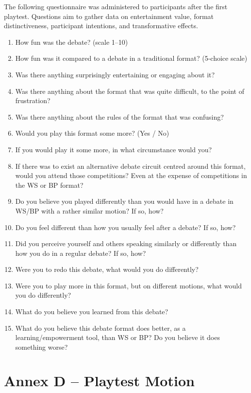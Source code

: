 \documentclass[12pt]{article}
\begin{document}
The following questionnaire was administered to participants after the first playtest. Questions aim to gather data on entertainment value, format distinctiveness, participant intentions, and transformative effects.

\begin{enumerate}
    \item How fun was the debate? (scale 1--10)
    \item How fun was it compared to a debate in a traditional format? (5-choice scale)
    \item Was there anything surprisingly entertaining or engaging about it?
    \item Was there anything about the format that was quite difficult, to the point of frustration?
    \item Was there anything about the rules of the format that was confusing?
    \item Would you play this format some more? (Yes / No)
    \item If you would play it some more, in what circumstance would you?
    \item If there was to exist an alternative debate circuit centred around this format, would you attend those competitions? Even at the expense of competitions in the WS or BP format?
    \item Do you believe you played differently than you would have in a debate in WS/BP with a rather similar motion? If so, how?
    \item Do you feel different than how you usually feel after a debate? If so, how?
    \item Did you perceive yourself and others speaking similarly or differently than how you do in a regular debate? If so, how?
    \item Were you to redo this debate, what would you do differently?
    \item Were you to play more in this format, but on different motions, what would you do differently?
    \item What do you believe you learned from this debate?
    \item What do you believe this debate format does better, as a learning/empowerment tool, than WS or BP? Do you believe it does something worse?
\end{enumerate}


\newpage
\section*{Annex D -- Playtest Motion}
\end{document}
